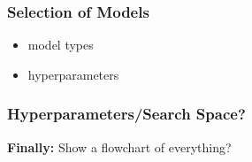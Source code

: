 \subsubsection{Selection of Models}

\begin{itemize}[noitemsep]
	\item model types
	\item hyperparameters
\end{itemize}

\subsubsection{Hyperparameters/Search Space?}


\textbf{Finally:} Show a flowchart of everything?






